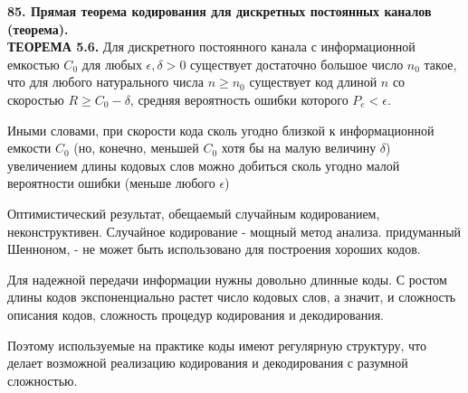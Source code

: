 \documentclass[14pt]{article}
\begin{document}
\bigskip
\textbf{85. Прямая теорема кодирования для дискретных постоянных каналов (теорема).} \\

\textbf{ТЕОРЕМА 5.6.} Для дискретного постоянного канала с
информационной емкостью \(C_0\) для любых \(\epsilon, \delta > 0\) существует
достаточно большое число \(n_0\) такое, что для любого натурального
числа \(n \geq n_0\) существует код длиной \(n\) со скоростью \(R \geq C_0 - \delta\), средняя
вероятность ошибки которого \(P_e < \epsilon\).

Иными словами, при скорости кода сколь угодно близкой к
информационной емкости \(C_0\) (но, конечно, меньшей \(C_0\) хотя бы на
малую величину \(\delta\)) увеличением длины кодовых слов можно добиться
сколь угодно малой вероятности ошибки (меньше любого \(\epsilon\))

Оптимистический результат, обещаемый случайным кодированием,
неконструктивен. Случайное кодирование - мощный метод анализа.
придуманный Шенноном, - не может быть использовано для
построения хороших кодов.

Для надежной передачи информации нужны довольно длинные
коды. С ростом длины кодов экспоненциально растет число кодовых
слов, а значит, и сложность описания кодов, сложность процедур
кодирования и декодирования.

Поэтому используемые на практике коды имеют регулярную
структуру, что делает возможной реализацию кодирования и
декодирования с разумной сложностью.
\end{document}

